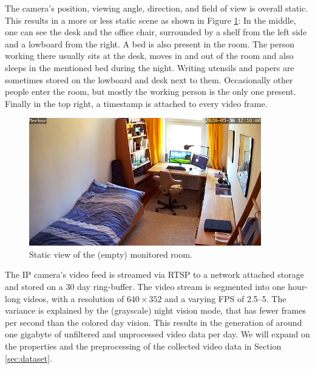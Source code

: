 The camera's position, viewing angle, direction, and field of view is overall static. This results in a more or less static scene as shown in Figure \ref{fig:room}: In the middle, one can see the desk and the office chair, surrounded by a shelf from the left side and a lowboard from the right. A bed is also present in the room. The person working there usually sits at the desk, moves in and out of the room and also sleeps in the mentioned bed during the night. Writing utensils and papers are sometimes stored on the lowboard and desk next to them. Occasionally other people enter the room, but mostly the working person is the only one present. Finally in the top right, a timestamp is attached to every video frame. 

\begin{figure}
	\centering
	\includegraphics[width=0.9\textwidth]{graphics/cctv/room.png}
  \caption[View of the monitored room.]{Static view of the (empty) monitored room.}
  \label{fig:room}
\end{figure}

The IP camera's video feed is streamed via RTSP to a network attached storage and stored on a 30 day ring-buffer. The video stream is segmented  into one hour-long videos, with a resolution of $640 \times 352$ and a varying FPS of 2.5--5. The variance is explained by the (grayscale) night vision mode, that has fewer frames per second than the colored day vision. This results in the generation of around one gigabyte of unfiltered and unprocessed video data per day. We will expand on the properties and the preprocessing of the collected video data in Section \ref{sec:dataset}.\\

